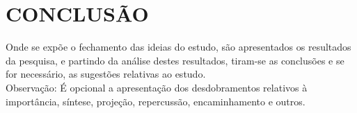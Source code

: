 \chapter{CONCLUSÃO}

Onde se expõe o fechamento das ideias do estudo, são apresentados os resultados da pesquisa, e partindo da análise destes resultados, tiram-se as conclusões e se for necessário, as sugestões relativas ao estudo. \\

Observação: É opcional a apresentação dos desdobramentos relativos à importância, síntese, projeção, repercussão, encaminhamento e outros.